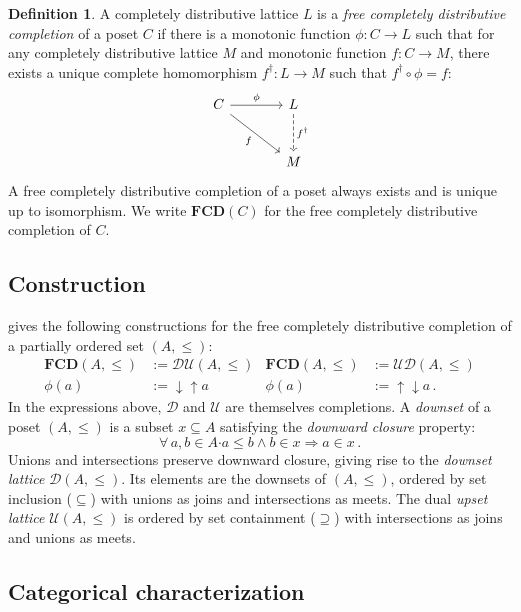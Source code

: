 \documentclass[11pt,oneside,draft]{book}
\theoremstyle{definition}
\newtheorem{definition}[theorem]{Definition}
\newcommand{\bdot}{\boldsymbol{\cdot}}
\begin{document}
\begin{definition} \label{def:fcd}
A completely distributive lattice $L$ is a
\emph{free completely distributive completion} of
a poset $C$ if there is
a monotonic function $\phi : C \rightarrow L$
such that
for any completely distributive lattice $M$
and monotonic function $f : C \rightarrow M$,
there exists a unique complete homomorphism
$f^\dagger : L \rightarrow M$
such that
$f^\dagger \circ \phi = f$:
\[
  \begin{tikzcd}[sep=large]
    C \arrow[r, "\phi"] \arrow[rd, "f"'] &
    L \arrow[d, "f^\dagger", dashed] \\ & M
  \end{tikzcd}
\]
A free completely distributive completion of a poset
always exists and is unique up to isomorphism.
We write $\mathbf{FCD}(C)$ for
the free completely distributive completion of $C$.
\end{definition}

\subsection{Construction} %

\citet{augtyp} gives the following constructions for
the free completely distributive completion of
a partially ordered set $(A, \le)$:
\begin{align*}
  \mathbf{FCD}(A, {\le}) &:= \mathcal{D} \mathcal{U}(A, {\le}) &
  \mathbf{FCD}(A, {\le}) &:= \mathcal{U} \mathcal{D}(A, {\le}) \\
  \phi(a) &:= {\downarrow}{\uparrow} a &
  \phi(a) &:= {\uparrow}{\downarrow} a \,.
\end{align*}
In the expressions above,
$\mathcal{D}$ and $\mathcal{U}$
are themselves completions.
A \emph{downset} of a poset $(A, {\le})$
is a subset $x \subseteq A$ satisfying
the \emph{downward closure} property:
\[
  \forall \, a, b \in A \bdot
          a \le b \wedge b \in x \Rightarrow a \in x \,.
\]
Unions and intersections preserve downward closure,
giving rise to the \emph{downset lattice} $\mathcal{D}(A, {\le})$.
Its elements are the downsets of $(A, {\le})$,
ordered by set inclusion (${\subseteq}$) with
unions as joins and intersections as meets.
The dual \emph{upset lattice} $\mathcal{U}(A, {\le})$
is ordered by set containment (${\supseteq}$) with
intersections as joins and unions as meets.


\subsection{Categorical characterization} %
\end{document}
